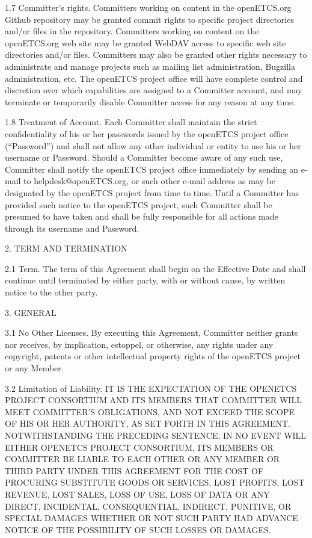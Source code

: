 1.7 Committer’s rights. Committers working on content in the openETCS.org Github
repository may be granted commit rights to specific project directories and/or files in the
repository. Committers working on content on the openETCS.org web site may be granted
WebDAV access to specific web site directories and/or files. Committers may also be
granted other rights necessary to administrate and manage projects such as mailing list
administration, Bugzilla administration, etc. The openETCS project office will have complete
control and discretion over which capabilities are assigned to a Committer account, and may
terminate or temporarily disable Committer access for any reason at any time.

1.8 Treatment of Account. Each Committer shall maintain the strict confidentiality of his or
her passwords issued by the openETCS project office (“Password”) and shall not allow any
other individual or entity to use his or her username or Password. Should a Committer
become aware of any such use, Committer shall notify the openETCS project office
immediately by sending an e-mail to helpdesk@openETCS.org, or such other e-mail address
as may be designated by the openETCS project from time to time. Until a Committer has
provided such notice to the openETCS project, such Committer shall be presumed to have
taken and shall be fully responsible for all actions made through its username and Password.

2. TERM AND TERMINATION

2.1 Term. The term of this Agreement shall begin on the Effective Date and shall continue
until terminated by either party, with or without cause, by written notice to the other party.

3. GENERAL

3.1 No Other Licenses. By executing this Agreement, Committer neither grants nor receives,
by implication, estoppel, or otherwise, any rights under any copyright, patents or other
intellectual property rights of the openETCS project or any Member.

3.2 Limitation of Liability. IT IS THE EXPECTATION OF THE OPENETCS PROJECT
CONSORTIUM AND ITS MEMBERS THAT COMMITTER WILL MEET COMMITTER’S
OBLIGATIONS, AND NOT EXCEED THE SCOPE OF HIS OR HER AUTHORITY, AS SET
FORTH IN THIS AGREEMENT. NOTWITHSTANDING THE PRECEDING SENTENCE, IN
NO EVENT WILL EITHER OPENETCS PROJECT CONSORTIUM, ITS MEMBERS OR
COMMITTER BE LIABLE TO EACH OTHER OR ANY MEMBER OR THIRD PARTY UNDER
THIS AGREEMENT FOR THE COST OF PROCURING SUBSTITUTE GOODS OR
SERVICES, LOST PROFITS, LOST REVENUE, LOST SALES, LOSS OF USE, LOSS OF
DATA OR ANY DIRECT, INCIDENTAL, CONSEQUENTIAL, INDIRECT, PUNITIVE, OR
SPECIAL DAMAGES WHETHER OR NOT SUCH PARTY HAD ADVANCE NOTICE OF
THE POSSIBILITY OF SUCH LOSSES OR DAMAGES.

